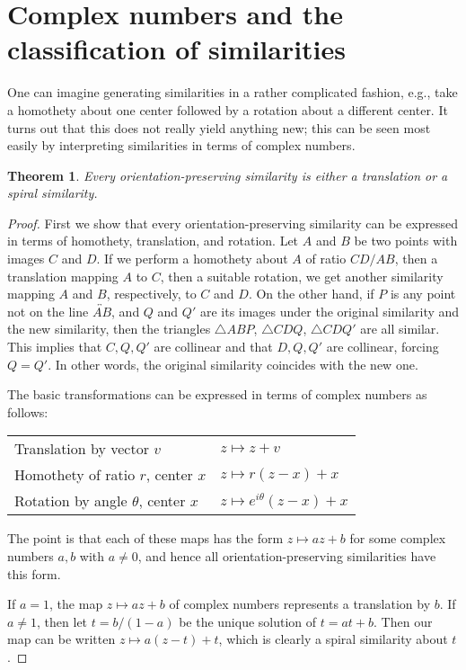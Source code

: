 \documentclass[12pt]{book}
\numberwithin{exc}{section}
\numberwithin{figure}{section}
\newtheorem{theorem}{Theorem}[section]
\numberwithin{equation}{theorem}
\def\line#1{\overleftrightarrow{#1}}
\begin{document}
\section{Complex numbers and the classification of similarities}
\label{sec:complex sim}

One can imagine generating similarities in a rather complicated fashion, e.g., take a homothety about one center followed by a rotation about a different center.  It turns out that this does not really yield anything new; this can be seen most easily by interpreting similarities in terms of complex numbers.
\begin{theorem} \label{thm:sim}
Every orientation-preserving similarity is either a translation or 
a spiral similarity.
\end{theorem}
\begin{proof}
First we show that every orientation-preserving similarity can be expressed in terms 
of homothety, translation, and rotation. Let $A$ and $B$ be two points 
with images $C$ and $D$. If we perform a homothety about $A$ of ratio 
$CD/AB$, then a translation mapping $A$ to $C$, then a suitable 
rotation, we get another similarity mapping
$A$ and $B$, respectively, to $C$ and $D$. On the other 
hand, if $P$ is any point not on the line $\line{AB}$, and $Q$ and $Q'$ are 
its images under the original similarity and the new similarity, 
then the triangles $\triangle ABP$, $\triangle CDQ$, $\triangle CDQ'$ 
are all similar. This implies that $C,Q,Q'$ are collinear and that
$D,Q,Q'$ are collinear, forcing $Q = Q'$. In 
other words, the original similarity coincides with the new one.

The basic transformations can be expressed in terms of complex 
numbers as follows:

\begin{center}
        \begin{tabular}{ll}
        Translation by vector $v$ & $z \mapsto z + v$ \\
        Homothety of ratio $r$, center $x$ & $z \mapsto r(z-x) + x$ \\
        Rotation by angle $\theta$, center $x$ & $z \mapsto e^{i\theta}(z-x) + 
        x $
        \end{tabular}
\end{center}
The point is that each of these maps has the form $z \mapsto az + b$ 
for some complex numbers $a,b$ with $a \neq 0$, and hence all orientation-preserving similarities have this form.

If $a=1$, the map $z \mapsto az+b$ of complex numbers represents a translation by $b$. If $a \neq 1$,  then let $t = b/(1-a)$ be the 
unique solution of $t = at + b$. Then our map can be written 
$z \mapsto a(z-t) + t$, which is clearly a spiral similarity about $t$.
\end{proof}
\end{document}
